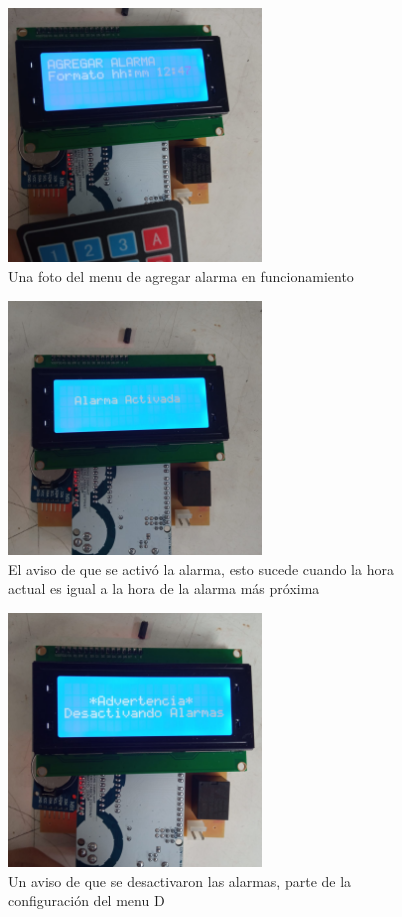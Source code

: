 \documentclass{article}
\begin{document}
\begin{figure}[H]
	\includegraphics[width=0.6\textwidth]{anexos/imagen5.jpg}
	\centering
	\caption{Una foto del menu de agregar alarma en funcionamiento}
\end{figure}

\begin{figure}[H]
	\includegraphics[width=0.6\textwidth]{anexos/imagen1.jpg}
	\centering
	\caption{El aviso de que se activó la alarma, esto sucede cuando la hora actual
	es igual a la hora de la alarma más próxima}
\end{figure}

\begin{figure}[H]
	\includegraphics[width=0.6\textwidth]{anexos/imagen2.jpg}
	\centering
	\caption{Un aviso de que se desactivaron las alarmas, parte de la configuración del menu D}
\end{figure}
\end{document}
